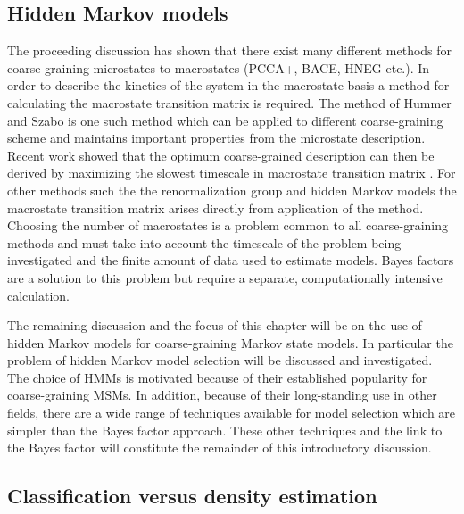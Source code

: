 \subsection{Hidden Markov models}

The proceeding discussion has shown that there exist many different methods for coarse-graining microstates to macrostates (PCCA+, BACE, HNEG etc.). In order to describe the kinetics of the system in the macrostate basis a method for calculating the macrostate transition matrix is required. The method of Hummer and Szabo \cite{hummerOptimalDimensionalityReduction2015a} is one such method which can be applied to different coarse-graining scheme and maintains important properties from the microstate description. Recent work showed that the optimum coarse-grained description can then be derived by maximizing the slowest timescale in macrostate transition matrix \cite{kellsCorrelationFunctionsMean2020, kellsMeanFirstPassage2019}. For other methods such the the renormalization group \cite{orioliDimensionalReductionMarkov2016c} and hidden Markov models \cite{noeProjectedHiddenMarkov2013a} the macrostate transition matrix arises directly from application of the method. Choosing the number of macrostates is a problem common to all coarse-graining methods and must take into account the timescale of the problem being investigated and the finite amount of data used to estimate models. Bayes factors are a solution to this problem but require a separate, computationally intensive calculation. 

The remaining discussion and the focus of this chapter will be on the use of hidden Markov models for coarse-graining Markov state models.  In particular the problem of hidden Markov model selection will be discussed and investigated. The choice of HMMs is motivated because of their established popularity for coarse-graining MSMs. In addition, because of their long-standing use in other fields, there are a wide range of techniques available for model selection which are simpler than the Bayes factor approach. These other techniques and the link to the Bayes factor will constitute the remainder of this introductory discussion. 


\subsection{Classification versus density estimation}

